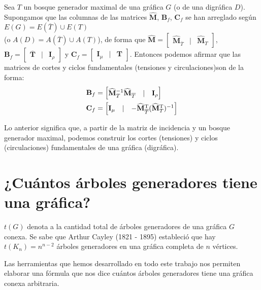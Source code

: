 \begin{cor}
Sea $T$ un bosque generador maximal de una gráfica $G$ (o de una digráfica $D$). Supongamos que las columnas de las matrices  $\mathbf{\widehat{M}}$, $\mathbf{B}_{f}$, $\mathbf{C}_{f}$ se han arreglado según $E(G) = E(\overline{T}) \cup E(T)$ \\(o $A(D) = A(\overline{T}) \cup A(T)$), de forma que $\mathbf{\widehat{M}} = \begin{bmatrix} \mathbf{\widehat{M}}_{\overline{T}} & |& \mathbf{\widehat{M}}_{T} \end{bmatrix}$, $\mathbf{B}_{f} = \begin{bmatrix} \mathbf{\overline{T}} & |& \mathbf{I}_{\rho} \end{bmatrix}$ y $\mathbf{C}_{f} = \begin{bmatrix} \mathbf{I}_{\mu} & |& \mathbf{T} \end{bmatrix}$. Entonces podemos afirmar que las matrices de cortes y ciclos fundamentales (tensiones y circulaciones)son de la forma:
\begin{align*}
    \mathbf{B}_{f} &= \begin{bmatrix} \mathbf{\widehat{M}}_{T}^{-1}\mathbf{\widehat{M}}_{\overline{T}} & |& \mathbf{I}_{\rho} \end{bmatrix} \\
    \mathbf{C}_{f} &= \begin{bmatrix} \mathbf{I}_{\mu} & |& -\mathbf{\widehat{M}}_{\overline{T}}^{\textnormal{T}}(\mathbf{\widehat{M}}_{T}^{\textnormal{T}})^{-1}  \end{bmatrix}
\end{align*}
\end{cor}

Lo anterior significa que, a partir de la matriz de incidencia y un bosque generador maximal, podemos construir los cortes (tensiones) y ciclos (circulaciones) fundamentales de una gráfica (digráfica).

\section{¿Cuántos árboles generadores tiene una gráfica?}

$t(G)$ denota a la cantidad total de árboles generadores de una gráfica $G$ conexa. Se sabe que Arthur Cayley (1821 - 1895) estableció que hay $t(K_{n}) = n^{n-2}$ árboles generadores en una gráfica completa de $n$ vértices.

Las herramientas que hemos desarrollado en todo este trabajo nos permiten elaborar una fórmula que nos dice cuántos árboles generadores tiene una gráfica conexa arbitraria. 

